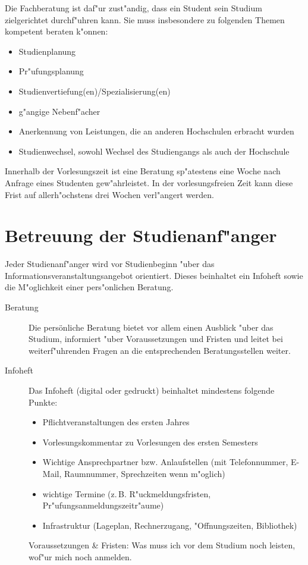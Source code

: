 Die Fachberatung ist daf"ur zust"andig, dass ein Student sein Studium
zielgerichtet durchf"uhren kann. Sie muss insbesondere zu folgenden
Themen kompetent beraten k"onnen:
\begin{itemize}
	\item Studienplanung
	\item Pr"ufungsplanung
	\item Studienvertiefung(en)/Spezialisierung(en)
	\item g"angige Nebenf"acher
	\item Anerkennung von Leistungen, die an anderen Hochschulen erbracht wurden
	\item Studienwechsel, sowohl Wechsel des Studiengangs als auch der Hochschule
\end{itemize}

Innerhalb der Vorlesungszeit ist eine Beratung sp"atestens eine Woche nach
Anfrage eines Studenten gew"ahrleistet. In der vorlesungsfreien Zeit
kann diese Frist auf allerh"ochstens drei Wochen verl"angert werden.

\section{Betreuung der Studienanf"anger}

Jeder Studienanf"anger wird vor Studienbeginn "uber das Informationsveranstaltungsangebot orientiert.
Dieses beinhaltet ein Infoheft sowie die M"oglichkeit einer pers"onlichen Beratung.

\begin{description}
	\item [Beratung] Die persönliche Beratung bietet vor allem einen Ausblick "uber das Studium, informiert "uber Voraussetzungen und Fristen und leitet bei weiterf"uhrenden Fragen an die entsprechenden Beratungsstellen weiter.

	\item [Infoheft] Das Infoheft (digital oder gedruckt) beinhaltet mindestens folgende Punkte:
	\begin{itemize}
		\item Pflichtveranstaltungen des ersten Jahres 
		\item Vorlesungskommentar zu Vorlesungen des ersten Semesters
		\item Wichtige Ansprechpartner bzw. Anlaufstellen (mit Telefonnummer,
			E-Mail, Raumnummer, Sprechzeiten wenn m"oglich)
		\item wichtige Termine (z.\,B. R"uckmeldungsfristen, Pr"ufungsanmeldungszeitr"aume)
		\item Infrastruktur (Lageplan, Rechnerzugang, "Offnungszeiten, Bibliothek)
	\end{itemize}

	\begin{kcmt}\begin{komacmt}
	Voraussetzungen \& Fristen: Was muss ich vor dem Studium noch leisten,
	wof"ur mich noch anmelden.
	\end{komacmt}\end{kcmt}
\end{description}

